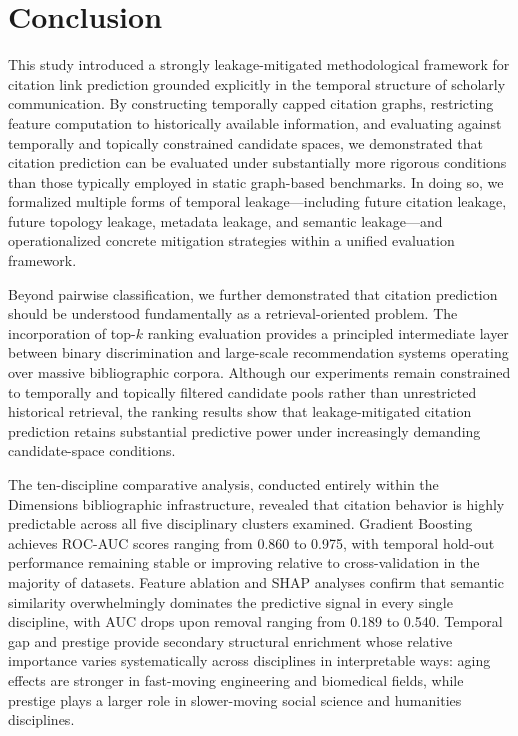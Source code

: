 \documentclass[11pt,a4paper]{article}
\begin{document}
\section{Conclusion}
\label{sec:conclusion}

This study introduced a strongly leakage-mitigated methodological framework for citation link prediction grounded explicitly in the temporal structure of scholarly communication. By constructing temporally capped citation graphs, restricting feature computation to historically available information, and evaluating against temporally and topically constrained candidate spaces, we demonstrated that citation prediction can be evaluated under substantially more rigorous conditions than those typically employed in static graph-based benchmarks. In doing so, we formalized multiple forms of temporal leakage---including future citation leakage, future topology leakage, metadata leakage, and semantic leakage---and operationalized concrete mitigation strategies within a unified evaluation framework.

Beyond pairwise classification, we further demonstrated that citation prediction should be understood fundamentally as a retrieval-oriented problem. The incorporation of top-\(k\) ranking evaluation provides a principled intermediate layer between binary discrimination and large-scale recommendation systems operating over massive bibliographic corpora. Although our experiments remain constrained to temporally and topically filtered candidate pools rather than unrestricted historical retrieval, the ranking results show that leakage-mitigated citation prediction retains substantial predictive power under increasingly demanding candidate-space conditions.

The ten-discipline comparative analysis, conducted entirely within the Dimensions bibliographic infrastructure, revealed that citation behavior is highly predictable across all five disciplinary clusters examined. Gradient Boosting achieves ROC-AUC scores ranging from 0.860 to 0.975, with temporal hold-out performance remaining stable or improving relative to cross-validation in the majority of datasets. Feature ablation and SHAP analyses confirm that semantic similarity overwhelmingly dominates the predictive signal in every single discipline, with AUC drops upon removal ranging from 0.189 to 0.540. Temporal gap and prestige provide secondary structural enrichment whose relative importance varies systematically across disciplines in interpretable ways: aging effects are stronger in fast-moving engineering and biomedical fields, while prestige plays a larger role in slower-moving social science and humanities disciplines.
\end{document}
